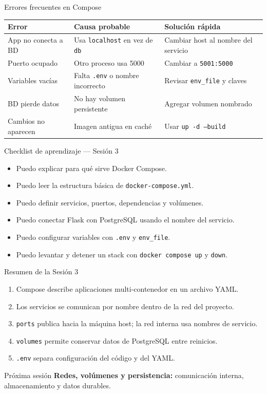 \documentclass[aspectratio=169]{beamer}
\begin{document}
\begin{frame}{Errores frecuentes en Compose}
  \scriptsize
  \begin{tabular}{p{} p{} p{}}
    \toprule
    Error & Causa probable & Solución rápida \\
    \midrule
    App no conecta a BD & Usa \texttt{localhost} en vez de \texttt{db} & Cambiar host al nombre del servicio \\
    Puerto ocupado & Otro proceso usa 5000 & Cambiar a \texttt{5001:5000} \\
    Variables vacías & Falta \texttt{.env} o nombre incorrecto & Revisar \texttt{env\_file} y claves \\
    BD pierde datos & No hay volumen persistente & Agregar volumen nombrado \\
    Cambios no aparecen & Imagen antigua en caché & Usar \texttt{up -d --build} \\
    \bottomrule
  \end{tabular}
\end{frame}

\begin{frame}{Checklist de aprendizaje — Sesión 3}
  \begin{itemize}
    \item Puedo explicar para qué sirve Docker Compose.
    \item Puedo leer la estructura básica de \texttt{docker-compose.yml}.
    \item Puedo definir servicios, puertos, dependencias y volúmenes.
    \item Puedo conectar Flask con PostgreSQL usando el nombre del servicio.
    \item Puedo configurar variables con \texttt{.env} y \texttt{env\_file}.
    \item Puedo levantar y detener un stack con \texttt{docker compose up} y \texttt{down}.
  \end{itemize}
\end{frame}

\begin{frame}{Resumen de la Sesión 3}
  \footnotesize
  \begin{enumerate}
    \item Compose describe aplicaciones multi-contenedor en un archivo YAML.
    \item Los servicios se comunican por nombre dentro de la red del proyecto.
    \item \texttt{ports} publica hacia la máquina host; la red interna usa nombres de servicio.
    \item \texttt{volumes} permite conservar datos de PostgreSQL entre reinicios.
    \item \texttt{.env} separa configuración del código y del YAML.
  \end{enumerate}
  \vspace{0.08cm}
  \begin{alertblock}{Próxima sesión}
    \textbf{Redes, volúmenes y persistencia:} comunicación interna, almacenamiento y datos durables.
  \end{alertblock}
\end{frame}
\end{document}
